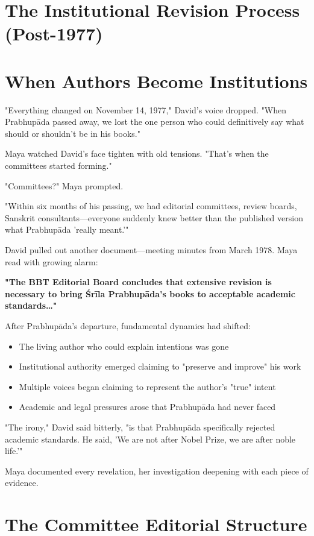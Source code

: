 \documentclass[11pt,twoside]{book}
\begin{document}
\section*{The Institutional Revision Process (Post-1977)}
\label{sec:org9edd2e8}

\section*{When Authors Become Institutions}
\label{sec:orgbd7f0a7}

"Everything changed on November 14, 1977," David's voice dropped. "When Prabhupāda passed away, we lost the one person who could definitively say what should or shouldn't be in his books."

Maya watched David's face tighten with old tensions. "That's when the committees started forming."

"Committees?" Maya prompted.

"Within six months of his passing, we had editorial committees, review boards, Sanskrit consultants—everyone suddenly knew better than the published version what Prabhupāda 'really meant.'"

David pulled out another document—meeting minutes from March 1978. Maya read with growing alarm:

\textbf{"The BBT Editorial Board concludes that extensive revision is necessary to bring Śrīla Prabhupāda's books to acceptable academic standards\ldots{}"}

After Prabhupāda's departure, fundamental dynamics had shifted:
\begin{itemize}
\item The living author who could explain intentions was gone
\item Institutional authority emerged claiming to "preserve and improve" his work
\item Multiple voices began claiming to represent the author's "true" intent
\item Academic and legal pressures arose that Prabhupāda had never faced
\end{itemize}

"The irony," David said bitterly, "is that Prabhupāda specifically rejected academic standards. He said, 'We are not after Nobel Prize, we are after noble life.'"

Maya documented every revelation, her investigation deepening with each piece of evidence.
\section*{The Committee Editorial Structure}
\label{sec:org04ed61f}
\end{document}

